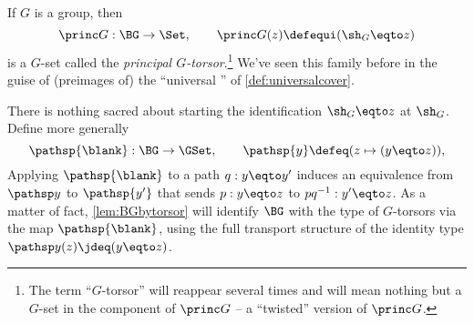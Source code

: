 \begin{example}\label{def:principaltorsor}
  If $G$ is a group, then
  \[
    \princ G:\BG\to\Set,
    \qquad\princ G(z)\defequi(\sh_G \eqto z)
  \]
  is a $G$-set called the \emph{principal $G$-torsor}.\footnote{%
    The term ``$G$-torsor'' will reappear several times and will mean nothing but a $G$-set in the component of $\princ G$ -- a ``twisted'' version of $\princ G$.}
  We've seen this family before in the guise of (preimages of) the
  ``universal \covering'' of \cref{def:universalcover}.

  There is nothing sacred about starting the identification
  $\sh_G \eqto z$ at $\sh_G$.
  Define more generally
  \begin{equation}\label{eq:pathsp}
    \pathsp{\blank}:\BG\to\GSet,
    \qquad
    \pathsp{y} \defeq (z \mapsto (y\eqto z)),
  \end{equation}
  Applying $\pathsp{\blank}$ to a path $q:y\eqto y'$
  induces an equivalence from $\pathsp y$ to $\pathsp {y'}$ that sends $p:y \eqto z$
  to $pq^{-1}:y'\eqto z$.
  As a matter of fact, \cref{lem:BGbytorsor} will identify $\BG$ with the type of
  $G$-torsors via the map $\pathsp{\blank}$,
  using the full transport structure of the identity 
  type $\pathsp y(z)\jdeq(y \eqto z)$.
\end{example}

